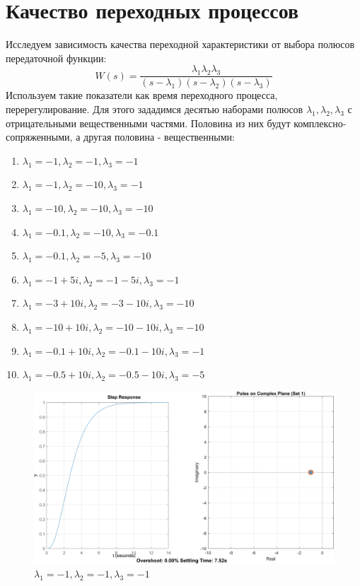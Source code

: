 \chapter{Качество переходных процессов }
Исследуем зависимость качества переходной характеристики от выбора полюсов передаточной функции:
\[
    W(s) = \frac{\lambda_1 \lambda_2 \lambda_3}{(s - \lambda_1)(s - \lambda_2)(s - \lambda_3)}
\]
Используем такие показатели как время переходного процесса, перерегулирование. Для этого
зададимся десятью наборами полюсов $\lambda_1, \lambda_2, \lambda_3$ с отрицательными вещественными частями.
Половина из них будут комплексно-сопряженными, а другая половина - вещественными:
\begin{enumerate}
    \item $\lambda_1 = -1, \lambda_2 = -1, \lambda_3 = -1$
    \item $\lambda_1 = -1, \lambda_2 = -10, \lambda_3 = -1$
    \item $\lambda_1 = -10, \lambda_2 = -10, \lambda_3 = -10$
    \item $\lambda_1 = -0.1, \lambda_2 = -10, \lambda_3 = -0.1$
    \item $\lambda_1 = -0.1, \lambda_2 = -5, \lambda_3 = -10$
    \item $\lambda_1 = -1+5i, \lambda_2 = -1-5i, \lambda_3 = -1$
    \item $\lambda_1 = -3+10i, \lambda_2 = -3-10i, \lambda_3 = -10$
    \item $\lambda_1 = -10 + 10i, \lambda_2 = -10 - 10i, \lambda_3 = -10$
    \item $\lambda_1 = -0.1+ 10i, \lambda_2 = -0.1 - 10i, \lambda_3 = -1$
    \item $\lambda_1 = -0.5+ 10i, \lambda_2 = -0.5 - 10i, \lambda_3 = -5$
\end{enumerate}

\begin{figure}[H]
    \centering
    \includegraphics[width=1\textwidth, trim={0cm 0cm 0cm 0cm}]{../images/4_1.png}
    \caption{$\lambda_1 = -1, \lambda_2 = -1, \lambda_3 = -1$}
\end{figure}

